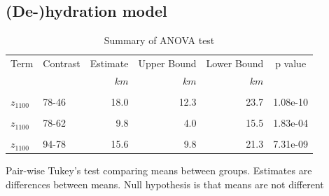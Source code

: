 \documentclass[draft,linenumbers]{agujournal2018} %
\providecommand{\DIFdeltex}[1]{{\protect\color{red} \scriptsize #1}} %
\providecommand{\DIFaddbegin}{} %
\providecommand{\DIFdelbegin}{} %
\providecommand{\DIFdelend}{} %
\providecommand{\DIFdel}[1]{\texorpdfstring{\DIFdeltex{#1}}{}} %
\newcommand{\DIFscaledelfig}{0.3}
\newlength{\DIFdelgraphicswidth} %
\newlength{\DIFdelgraphicsheight} %
\newcommand{\DIFaddincludegraphics}[2][]{{\color{blue}\fbox{\DIFOincludegraphics[#1]{#2}}}} %
\newcommand{\DIFdelincludegraphics}[2][]{%
\sbox{\DIFdelgraphicsbox}{\DIFOincludegraphics[#1]{#2}}%
\settoboxwidth{\DIFdelgraphicswidth}{\DIFdelgraphicsbox} %
\settoboxtotalheight{\DIFdelgraphicsheight}{\DIFdelgraphicsbox} %
\scalebox{\DIFscaledelfig}{%
\parbox[b]{\DIFdelgraphicswidth}{\usebox{\DIFdelgraphicsbox}\\[-\baselineskip] \rule{\DIFdelgraphicswidth}{0em}}\llap{\resizebox{\DIFdelgraphicswidth}{\DIFdelgraphicsheight}{%
\setlength{\unitlength}{\DIFdelgraphicswidth}%
\begin{picture}(1,1)%
\thicklines\linethickness{2pt} %
{\color[rgb]{1,0,0}\put(0,0){\framebox(1,1){}}}%
{\color[rgb]{1,0,0}\put(0,0){\line( 1,1){1}}}%
{\color[rgb]{1,0,0}\put(0,1){\line(1,-1){1}}}%
\end{picture}%
}\hspace*{3pt}}} %
} %
\DeclareRobustCommand{\DIFaddbegin}{\DIFOaddbegin \let\includegraphics\DIFaddincludegraphics} %
\DeclareRobustCommand{\DIFdelbegin}{\DIFOdelbegin \let\includegraphics\DIFdelincludegraphics} %
\DeclareRobustCommand{\DIFdelend}{\DIFOaddend \let\includegraphics\DIFOincludegraphics} %
\begin{document}
\DIFdelbegin \subsection*{\DIFdel{(De-)hydration model}}
\DIFdelend \DIFaddbegin \begin{table}

\caption{\label{tab:anova}Summary of ANOVA test}
\centering
\fontsize{8}{10}\selectfont
\begin{threeparttable}
\begin{tabular}[t]{llrrrl}
\toprule
\multicolumn{1}{c}{Term} & \multicolumn{1}{c}{Contrast} & \multicolumn{1}{c}{Estimate} & \multicolumn{1}{c}{Upper Bound} & \multicolumn{1}{c}{Lower Bound} & \multicolumn{1}{c}{p value} \\
 &  & $km$ & $km$ & $km$ & \\
\midrule
\cellcolor{gray!6}{$z_{1100}$} & \cellcolor{gray!6}{62-46} & \cellcolor{gray!6}{8.3} & \cellcolor{gray!6}{2.5} & \cellcolor{gray!6}{14.0} & \cellcolor{gray!6}{1.84e-03}\\
$z_{1100}$ & 78-46 & 18.0 & 12.3 & 23.7 & 1.08e-10\\
\cellcolor{gray!6}{$z_{1100}$} & \cellcolor{gray!6}{94-46} & \cellcolor{gray!6}{33.6} & \cellcolor{gray!6}{27.8} & \cellcolor{gray!6}{39.3} & \cellcolor{gray!6}{1.99e-11}\\
$z_{1100}$ & 78-62 & 9.8 & 4.0 & 15.5 & 1.83e-04\\
\cellcolor{gray!6}{$z_{1100}$} & \cellcolor{gray!6}{94-62} & \cellcolor{gray!6}{25.3} & \cellcolor{gray!6}{19.6} & \cellcolor{gray!6}{31.0} & \cellcolor{gray!6}{1.99e-11}\\
\addlinespace
$z_{1100}$ & 94-78 & 15.6 & 9.8 & 21.3 & 7.31e-09\\
\bottomrule
\end{tabular}
\begin{tablenotes}
\item Pair-wise Tukey's test comparing means between groups. Estimates are differences between means. Null hypothesis is that means are not different
\end{tablenotes}
\end{threeparttable}
\end{table}
\end{document}
